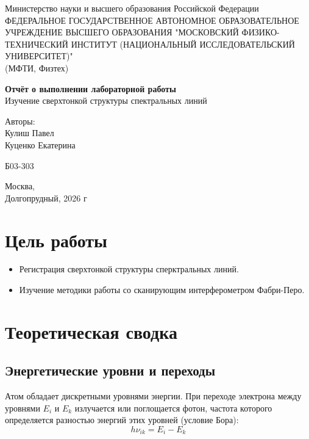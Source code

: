 \documentclass[12pt,a5paper,titlepage, main = russian]{article}
\begin{document}
\begin{titlepage}
\begin{center}
    \small{Министерство науки и высшего образования Российской Федерации}\\
    ФЕДЕРАЛЬНОЕ ГОСУДАРСТВЕННОЕ АВТОНОМНОЕ ОБРАЗОВАТЕЛЬНОЕ УЧРЕЖДЕНИЕ ВЫСШЕГО ОБРАЗОВАНИЯ "МОСКОВСКИЙ ФИЗИКО-ТЕХНИЧЕСКИЙ ИНСТИТУТ (НАЦИОНАЛЬНЫЙ ИССЛЕДОВАТЕЛЬСКИЙ УНИВЕРСИТЕТ)"\\
    (МФТИ, Физтех)
\end{center}
\vspace{2.5cm}
{\huge
    \begin{center}
        {\bf Отчёт о выполнении лабораторной работы}\\
        Изучение сверхтонкой структуры спектральных линий
    \end{center}
}
\vspace{1.5cm}
\begin{flushright}
    {\large Авторы:\\  
Кулиш Павел \\
Куценко Екатерина \\
        \vspace{0.2cm}
        
        Б03-303}
\end{flushright}
\vspace{0.3cm}
\begin{center}
        Москва, \\
        Долгопрудный, 2026 г
\end{center}

\end{titlepage}


\tableofcontents
\newpage



\section{Цель работы}
\begin{itemize}
    \item Регистрация сверхтонкой структуры сперктральных линий.
    \item Изучение методики работы со сканирующим интерферометром Фабри-Перо.
\end{itemize}
\section{Теоретическая сводка}
\subsection{Энергетические уровни и переходы} 
Атом обладает дискретными уровнями энергии. При переходе электрона между уровнями \(E_i\) и \(E_k\) излучается или поглощается фотон, частота которого определяется разностью энергий этих уровней (условие Бора):\\
    \begin{equation}
        h\nu_{ik} = E_i - E_k
    \end{equation}
\\
\end{document}
